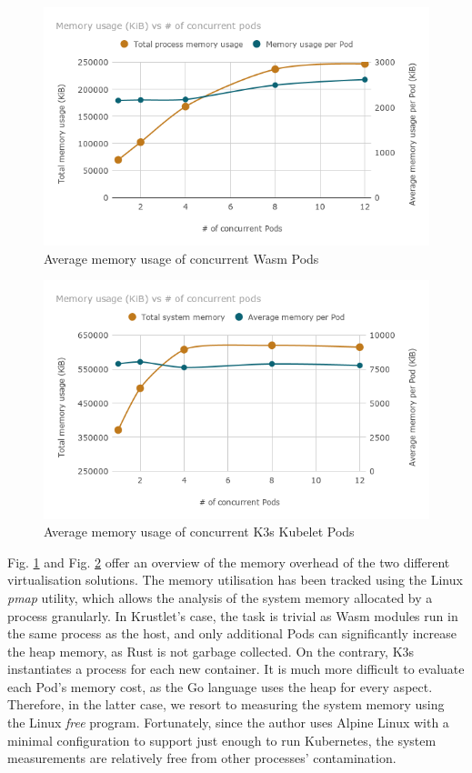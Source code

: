 \begin{figure}[h]
\centering
\includegraphics[width=\columnwidth]{figures/b-krustlet-2}
\caption{Average memory usage of concurrent Wasm Pods \label{fig:b-krustlet-2}}
\end{figure}

\begin{figure}[h]
\centering
\includegraphics[width=\columnwidth]{figures/b-krustlet-3}
\caption{Average memory usage of concurrent K3s Kubelet Pods \label{fig:b-krustlet-3}}
\end{figure}

Fig. \ref{fig:b-krustlet-2} and Fig. \ref{fig:b-krustlet-3} offer an overview of the memory overhead of the two different virtualisation solutions. The memory utilisation has been tracked using the Linux \emph{pmap} utility, which allows the analysis of the system memory allocated by a process granularly. In Krustlet's case, the task is trivial as Wasm modules run in the same process as the host, and only additional Pods can significantly increase the heap memory, as Rust is not garbage collected. On the contrary, K3s instantiates a process for each new container. It is much more difficult to evaluate each Pod's memory cost, as the Go language uses the heap for every aspect. Therefore, in the latter case, we resort to measuring the system memory using the Linux \emph{free} program. Fortunately, since the author uses Alpine Linux with a minimal configuration to support just enough to run Kubernetes, the system measurements are relatively free from other processes' contamination.

